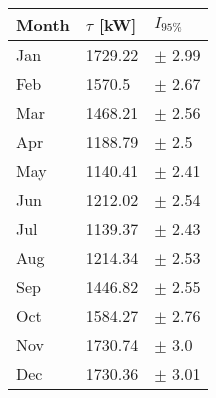\begin{tabular}{lll}
\toprule
Month & $\tau$ [kW] &   $I_{95\%}$ \\
\midrule
  Jan &     1729.22 &   $\pm$ 2.99 \\
  Feb &      1570.5 &   $\pm$ 2.67 \\
  Mar &     1468.21 &   $\pm$ 2.56 \\
  Apr &     1188.79 &    $\pm$ 2.5 \\
  May &     1140.41 &   $\pm$ 2.41 \\
  Jun &     1212.02 &   $\pm$ 2.54 \\
  Jul &     1139.37 &   $\pm$ 2.43 \\
  Aug &     1214.34 &   $\pm$ 2.53 \\
  Sep &     1446.82 &   $\pm$ 2.55 \\
  Oct &     1584.27 &   $\pm$ 2.76 \\
  Nov &     1730.74 &    $\pm$ 3.0 \\
  Dec &     1730.36 &   $\pm$ 3.01 \\
\bottomrule
\end{tabular}
